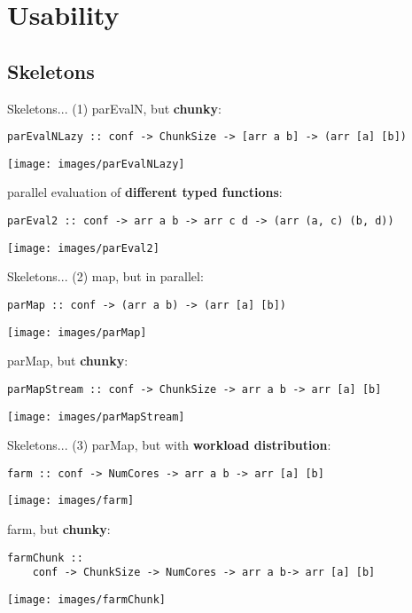 \section{Usability}
\subsection{Skeletons}
\begin{frame}[fragile]{Skeletons... (1)}
parEvalN, but \textbf{chunky}:
\begin{lstlisting}[frame=htrbl]
parEvalNLazy :: conf -> ChunkSize -> [arr a b] -> (arr [a] [b])
\end{lstlisting}
\begin{center}
\texttt{[image: images/parEvalNLazy]}
\end{center}
parallel evaluation of \textbf{different typed functions}:
\begin{lstlisting}[frame=htrbl]
parEval2 :: conf -> arr a b -> arr c d -> (arr (a, c) (b, d))
\end{lstlisting}
\begin{center}
\texttt{[image: images/parEval2]}
\end{center}
\end{frame}
\begin{frame}[fragile]{Skeletons... (2)}
map, but in  parallel:
\begin{lstlisting}[frame=htrbl]
parMap :: conf -> (arr a b) -> (arr [a] [b])
\end{lstlisting}
\begin{center}
\texttt{[image: images/parMap]}
\end{center}
parMap, but \textbf{chunky}:
\begin{lstlisting}[frame=htrbl]
parMapStream :: conf -> ChunkSize -> arr a b -> arr [a] [b]
\end{lstlisting}
\begin{center}
\texttt{[image: images/parMapStream]}
\end{center}
\end{frame}
\begin{frame}[fragile]{Skeletons... (3)}
parMap, but with \textbf{workload distribution}:
\begin{lstlisting}[frame=htrbl]
farm :: conf -> NumCores -> arr a b -> arr [a] [b]
\end{lstlisting}
\begin{center}
\texttt{[image: images/farm]}
\end{center}
farm, but \textbf{chunky}:
\begin{lstlisting}[frame=htrbl]
farmChunk ::
	conf -> ChunkSize -> NumCores -> arr a b-> arr [a] [b]
\end{lstlisting}
\begin{center}
\texttt{[image: images/farmChunk]}
\end{center}
\end{frame}